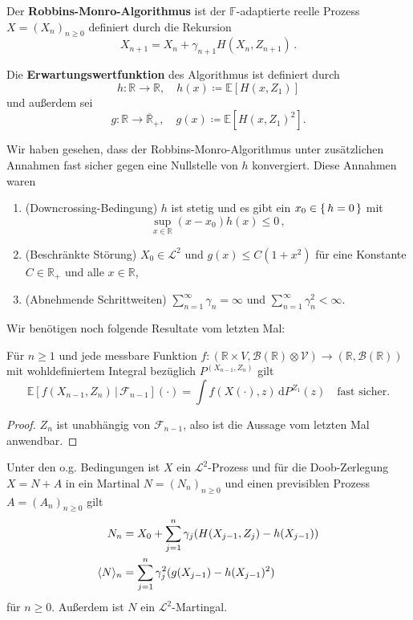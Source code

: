 \documentclass[ngerman,a4paper,11pt]{scrartcl}
\newcommand{\EE}{\mathbb{E}}
\newcommand{\FF}{\mathbb{F}}
\newcommand{\RR}{\mathbb{R}}
\newcommand{\bb}{\mathcal{B}}
\newcommand{\ff}{\mathcal{F}}
\renewcommand{\ll}{\mathcal{L}}
\newcommand{\vv}{\mathcal{V}}
\newcommand{\zspace}{V}
\newcommand{\zsigma}{\vv}
\newcommand{\interv}{\RR}
\newcommand{\expect}[1]{\EE[#1]}
\newcommand{\condexp}[2]{\EE[#1\,|\,#2]}
\newcommand{\dvar}[1]{\,\mathrm{d}#1}
\DeclarePairedDelimiter{\sprod}{\langle}{\rangle}	%
\begin{document}
Der \textbf{Robbins-Monro-Algorithmus} ist der $\FF$-adaptierte reelle Prozess
$X=(X_n)_{n\geq 0}$ definiert durch die Rekursion
\begin{equation}
  \label{eq:algo}
  X_{n+1}=X_n+\gamma_{n+1}H(X_n,Z_{n+1})\,.
\end{equation}

Die \textbf{Erwartungswertfunktion} des Algorithmus ist definiert durch
\begin{equation*}
 h:\interv\to\RR,\quad h(x)\coloneqq\expect{H(x,Z_1)}
\end{equation*}
und außerdem sei
\begin{equation*}
 g:\interv\to\overline{\RR}_+,\quad g(x)\coloneqq\expect{H(x,Z_1)^2}.
\end{equation*}

\begin{rem}
  \label{rem:11.2}
  Wir haben gesehen, dass der Robbins-Monro-Algorithmus unter zusätzlichen
  Annahmen fast sicher gegen eine Nullstelle von $h$ konvergiert. Diese Annahmen
  waren
  \begin{enumerate}[label=(\alph*)]
  \item (Downcrossing-Bedingung) $h$ ist stetig und es gibt ein $x_0\in
    \set{h=0}$ mit
    \begin{equation*}
      \sup_{x\in\interv}(x-x_0)h(x)\leq 0\,,
    \end{equation*}
  \item (Beschränkte Störung) $X_0\in\ll^2$ und $g(x)\leq C(1+x^2)$ für eine
    Konstante $C\in\RR_+$ und alle $x\in\interv$,\label{rem:beschr}
  \item (Abnehmende Schrittweiten) $\sum_{n=1}^\infty \gamma_n=\infty$ und
    $\sum_{n=1}^\infty\gamma_n^2<\infty$.
  \end{enumerate}
\end{rem}
Wir benötigen noch folgende Resultate vom letzten Mal:
\begin{lem}\label{lem:subst}
 Für $n\geq 1$ und jede messbare Funktion $f:(\interv\times \zspace,\bb(\interv)\otimes\zsigma)\to(\RR,\bb(\RR))$ mit
 wohldefiniertem Integral bezüglich $P^{(X_{n-1},Z_n)}$ gilt
 \begin{equation*}
  \condexp{f(X_{n-1}, Z_n)}{\ff_{n-1}}(\cdot)=\int f(X(\cdot), z)\dvar{P^{Z_1}(z)}\quad\text{fast sicher.}
 \end{equation*}
\end{lem}
\begin{proof}
 $Z_n$  ist unabhängig von $\ff_{n-1}$, also ist die Aussage vom letzten Mal anwendbar.
\end{proof}
\begin{lem}\label{lem:doob}
 Unter den o.g. Bedingungen ist $X$ ein $\ll^2$-Prozess und für die
 Doob-Zerlegung $X=N+A$ in ein Martinal $N=(N_n)_{n\geq 0}$ und einen
 previsiblen Prozess $A=(A_n)_{n\geq 0}$ gilt
 \begin{align*}
  N_n&=X_0+\sum_{j=1}^n\gamma_j(H(X_{j-1},Z_j)-h(X_{j-1})) \\
  \sprod{N}_n&=\sum_{j=1}^n\gamma_j^2(g(X_{j-1})-h(X_{j-1})^2)
 \end{align*}
 für $n\geq 0$. Außerdem ist $N$ ein $\ll^2$-Martingal.
\end{lem}
\end{document}
